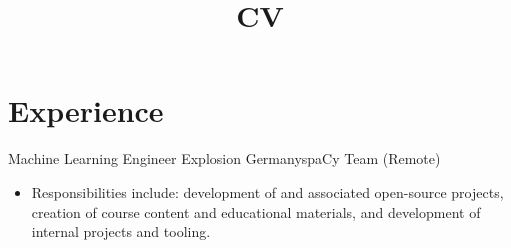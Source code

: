 \documentclass[12pt,a4paper]{moderncv}
\title{CV}
\begin{document}
\maketitle


\section{Experience}

{Machine Learning Engineer}
{Explosion}
{Germany}{spaCy Team (Remote)}
{
    \begin{itemize}
        \item Responsibilities include: development of {\color{blue}
            } and associated open-source
            projects, creation of course content and educational materials, and
            development of internal projects and tooling. 
    \end{itemize}
}
\end{document}
